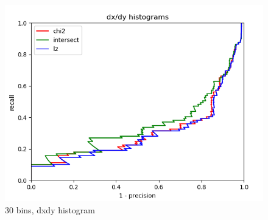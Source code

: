 \documentclass{article}
\begin{document}
\begin{figure}[ht]
\begin{minipage}{.5\textwidth}
        \includegraphics[width=\linewidth]{images/Q4.b-dxdy_histogram_30_bins.png}
        \caption{30 bins, dxdy histogram}
    \end{minipage}
\end{figure}
\end{document}
